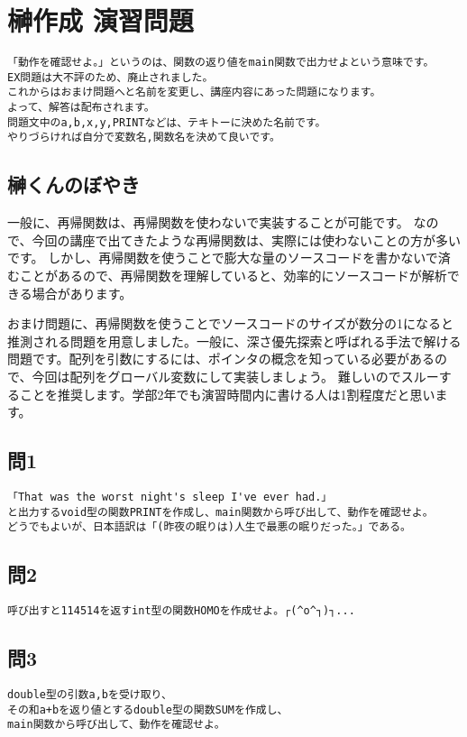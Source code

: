 \section{榊作成 演習問題}
\begin{verbatim}
「動作を確認せよ。」というのは、関数の返り値をmain関数で出力せよという意味です。
EX問題は大不評のため、廃止されました。
これからはおまけ問題へと名前を変更し、講座内容にあった問題になります。
よって、解答は配布されます。
問題文中のa,b,x,y,PRINTなどは、テキトーに決めた名前です。
やりづらければ自分で変数名,関数名を決めて良いです。
\end{verbatim}

\subsection{榊くんのぼやき}
一般に、再帰関数は、再帰関数を使わないで実装することが可能です。
なので、今回の講座で出てきたような再帰関数は、実際には使わないことの方が多いです。
しかし、再帰関数を使うことで膨大な量のソースコードを書かないで済むことがあるので、再帰関数を理解していると、効率的にソースコードが解析できる場合があります。

おまけ問題に、再帰関数を使うことでソースコードのサイズが数分の1になると推測される問題を用意しました。一般に、深さ優先探索と呼ばれる手法で解ける問題です。配列を引数にするには、ポインタの概念を知っている必要があるので、今回は配列をグローバル変数にして実装しましょう。
難しいのでスルーすることを推奨します。学部2年でも演習時間内に書ける人は1割程度だと思います。

\subsection{問1}
\begin{verbatim}
「That was the worst night's sleep I've ever had.」
と出力するvoid型の関数PRINTを作成し、main関数から呼び出して、動作を確認せよ。
どうでもよいが、日本語訳は「(昨夜の眠りは)人生で最悪の眠りだった。」である。
\end{verbatim}

\subsection{問2}
\begin{verbatim}
呼び出すと114514を返すint型の関数HOMOを作成せよ。┌(^o^┐)┐...
\end{verbatim}

\subsection{問3}
\begin{verbatim}
double型の引数a,bを受け取り、
その和a+bを返り値とするdouble型の関数SUMを作成し、
main関数から呼び出して、動作を確認せよ。
\end{verbatim}

